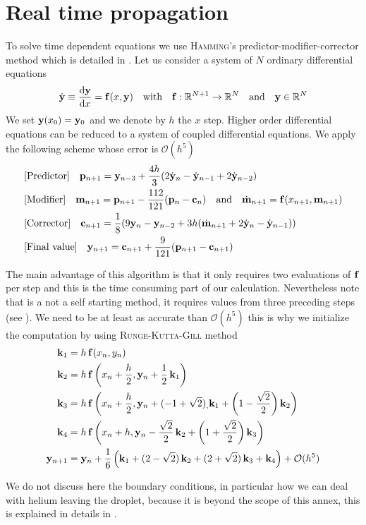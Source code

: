 \section{Real time propagation}
\label{sec:ANX-rtp}

To solve time dependent equations we use \textsc{Hamming}'s predictor-modifier-corrector method which is detailed in \cite{B-Ral1960}. Let us consider a system of $N$ ordinary differential equations
\begin{align}
\dot{\vb{y}} \equiv \dv{\vb{y}}{x}=\vb{f}(x,\vb{y}) \quad \text{with} \quad \vb{f}:\mathbb{R}^{N+1}\rightarrow\mathbb{R}^N \quad \text{and} \quad \vb{y} \in \mathbb{R}^N
\end{align}
We set $\vb{y}(x_0) = \vb{y}_0$ and we denote by $h$ the $x$ step. Higher order differential equations can be reduced to a system of coupled differential equations. We apply the following scheme whose error is $\mathcal{O}(h^5)$
\begin{align}
&\text{[Predictor]} \quad \vb{p}_{n+1} =\vb{y}_{n-3} + \frac{4h}{3}(2\dot{\vb{y}}_n-\dot{\vb{y}}_{n-1} + 2\dot{\vb{y}}_{n-2}) \label{eq:RTP-3} \\
&\text{[Modifier]} \quad \vb{m}_{n+1} = \vb{p}_{n+1} - \frac{112}{121}(\vb{p}_n-\vb{c}_n) \quad \text{and} \quad \dot{\vb{m}}_{n+1} =\vb{f}(x_{n+1},\vb{m}_{n+1}) \\
&\text{[Corrector]} \quad \vb{c}_{n+1} = \frac{1}{8}(9\vb{y}_n-\vb{y}_{n-2}+3h(\dot{\vb{m}}_{n+1} + 2 \dot{\vb{y}}_n-\dot{\vb{y}}_{n-1})) \\
&\text{[Final value]} \quad \vb{y}_{n+1} = \vb{c}_{n+1} + \frac{9}{121}(\vb{p}_{n+1}-\vb{c}_{n+1})
\end{align}

The main advantage of this algorithm is that it only requires two evaluations of $\vb{f}$ per step and this is the time consuming part of our calculation. 
Nevertheless note that is a not a self starting method, it requires values from three preceding steps (see ). We need to be at least as accurate than $\mathcal{O}(h^5)$ this is why we initialize the computation by using \textsc{Runge-Kutta-Gill} method
\begin{align}
\vb{k}_1 &= h \, \vb{f} ( x_n,y_n) \\
\vb{k}_2 &= h \, \vb{f}\left(x_n+\frac{h}{2}, \vb{y}_n + \frac{1}{2}\,\vb{k}_1  \right)\\
\vb{k}_3 &= h \, \vb{f}\left(x_n+\frac{h}{2}, \vb{y}_n + (-1+\sqrt{2}) _, \vb{k}_1 + \left(1-\frac{\sqrt{2}}{2}\right)\vb{k}_2\right)\\
\vb{k}_4 &= h \, \vb{f}\left(x_n+h, \vb{y}_n -\frac{\sqrt{2}}{2} \, \vb{k}_2 + \left(1+\frac{\sqrt{2}}{2}\right)\vb{k}_3\right)\\
\vb{y}_{n+1} &= \vb{y}_n + \frac{1}{6} \left(\vb{k}_1 + (2-\sqrt{2}) \, \vb{k}_2 + (2+\sqrt{2}) \, \vb{k}_3 + \vb{k}_4\right) + \mathcal{O}(h^5)
\end{align}

We do not discuss here the boundary conditions, in particular how we can deal with helium leaving the droplet, because it is beyond the scope of this annex, this is explained in details in \cite{DFTguide}.